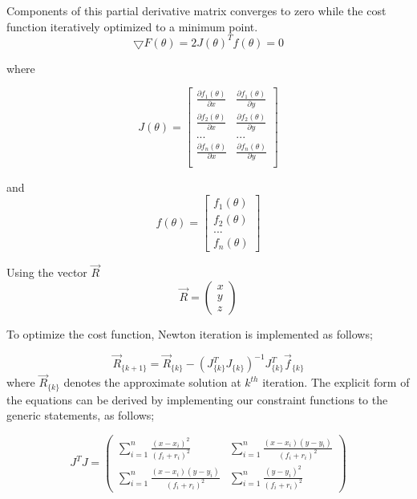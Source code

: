 \documentclass[twoside]{article}
\begin{document}
Components of this partial derivative matrix converges to zero while the cost function iteratively optimized to a minimum point. 
\begin{equation}
\bigtriangledown{F(\theta)} = 2J(\theta)^Tf(\theta) = 0
\end{equation}

where

\begin{equation}
J(\theta) = \begin{bmatrix}
  \frac{\partial{f_1(\theta)}}{\partial{x}} & \frac{\partial{f_1(\theta)}}{\partial{y}} \\
  \frac{\partial{f_2(\theta)}}{\partial{x}} & \frac{\partial{f_2(\theta)}}{\partial{y}} \\
  ... & ... \\
  \frac{\partial{f_n(\theta)}}{\partial{x}} & \frac{\partial{f_n(\theta)}}{\partial{y}} \\
\end{bmatrix}
\end{equation}

and 
\begin{equation}
 f(\theta) = \begin{bmatrix}
  f_1(\theta) \\
  f_2(\theta) \\
  ...         \\
  f_n(\theta)
 \end{bmatrix}
\end{equation}
	
Using the vector $\vec{R}$	
\begin{equation}
 \vec{R} = \left(\begin{matrix}
  x \\ y \\ z
 \end{matrix}\right)
\end{equation}

To optimize the cost function, Newton iteration is implemented as follows;

\begin{equation}
 \vec{R}_{\{k+1\}} =  \vec{R}_{\{k\}} - (J^T_{\{k\}}J_{\{k\}})^{-1}J^T_{\{k\}}\vec{f}_{\{k\}}
\end{equation}	
	where $\vec{R}_{\{k\}}$ denotes the approximate solution at $k^{th}$ iteration. The explicit form of the equations can be derived  by implementing our constraint functions to the generic statements, as follows;
	
\begin{equation}
  J^TJ = \left(\begin{matrix}
 \sum_{i=1}^{n} \frac{(x-x_i)^2}{(f_i+r_i)^2} &  \sum_{i=1}^{n} \frac{(x-x_i)(y-y_i)}{(f_i+r_i)^2} \\
  \sum_{i=1}^{n} \frac{(x-x_i)(y-y_i)}{(f_i+r_i)^2} &  \sum_{i=1}^{n} \frac{(y-y_i)^2}{(f_i+r_i)^2}
  \end{matrix}\right)
\end{equation}	
\end{document}
